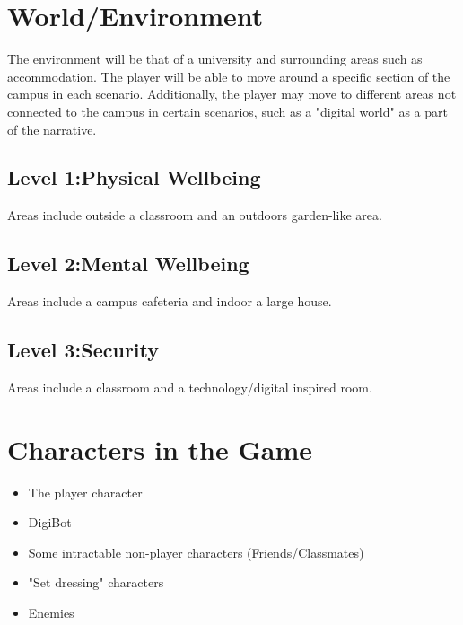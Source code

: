 \documentclass[a4paper]{scrreprt}
\begin{document}
\section{World/Environment}
The environment will be that of a university and surrounding areas such as accommodation. The player will be able to move around a specific section of the campus in each scenario. Additionally, the player may move to different areas not connected to the campus in certain scenarios, such as a "digital world" as a part of the narrative.

\subsection{Level 1:Physical Wellbeing}
Areas include outside a classroom and an outdoors garden-like area. 

\subsection{Level 2:Mental Wellbeing}
Areas include a campus cafeteria and indoor a large house.

\subsection{Level 3:Security}
Areas include a classroom and a technology/digital inspired room.

\section{Characters in the Game}
\begin{itemize}
\item The player character
\item DigiBot
\item Some intractable non-player characters (Friends/Classmates) 
\item "Set dressing" characters
\item Enemies
\end{itemize}
\end{document}
